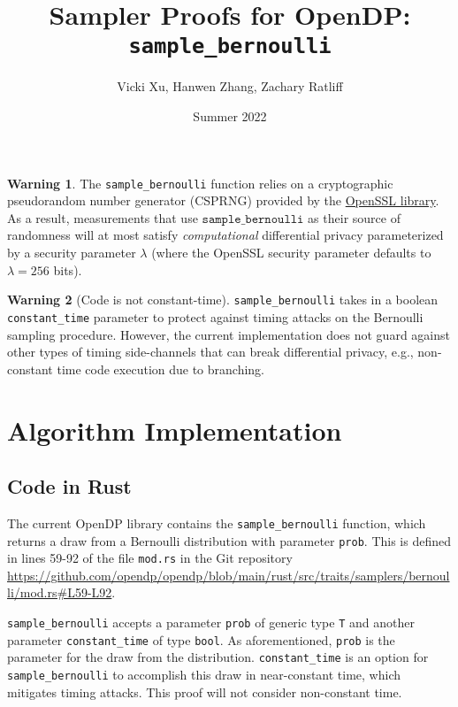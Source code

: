 \documentclass[11pt,a4paper]{article}
\title{Sampler Proofs for OpenDP: \texttt{sample\_bernoulli}}
\author{Vicki Xu, Hanwen Zhang, Zachary Ratliff}
\date{Summer 2022}
\theoremstyle{definition}
\newtheorem{warning}{Warning}
\begin{document}
\maketitle
\tableofcontents

\begin{tcolorbox}
\begin{warning}
The \texttt{sample\_bernoulli} function relies on a cryptographic pseudorandom number generator (CSPRNG) provided by the \href{https://www.openssl.org/docs/man1.1.1/man3/RAND_bytes.html}{OpenSSL library}. As a result, measurements that use $\texttt{sample\_bernoulli}$ as their source of randomness will at most satisfy \emph{computational} differential privacy parameterized by a security parameter $\lambda$ (where the OpenSSL security parameter defaults to $\lambda = 256$ bits). 
\end{warning}
\end{tcolorbox}

\begin{tcolorbox}
\begin{warning}[Code is not constant-time]
 \texttt{sample\_bernoulli} takes in a boolean \texttt{constant\_time} parameter to protect against timing attacks on the Bernoulli sampling procedure. However, the current implementation does not guard against other types of timing side-channels that can break differential privacy, e.g., non-constant time code execution due to branching.
\end{warning}
\end{tcolorbox}

\section{Algorithm Implementation}
\subsection{Code in Rust}

The current OpenDP library contains the \texttt{sample\_bernoulli} function, which returns a draw from a Bernoulli distribution with parameter \texttt{prob}. This is defined in lines 59-92 of the file \texttt{mod.rs} in the Git repository \url{https://github.com/opendp/opendp/blob/main/rust/src/traits/samplers/bernoulli/mod.rs#L59-L92}. 

\texttt{sample\_bernoulli} accepts a parameter \texttt{prob} of generic type \texttt{T} and another parameter \texttt{constant\_time} of type \texttt{bool}. As aforementioned, \texttt{prob} is the parameter for the draw from the distribution. \texttt{constant\_time} is an option for \texttt{sample\_bernoulli} to accomplish this draw in near-constant time, which mitigates timing attacks. This proof will not consider non-constant time.
\end{document}

